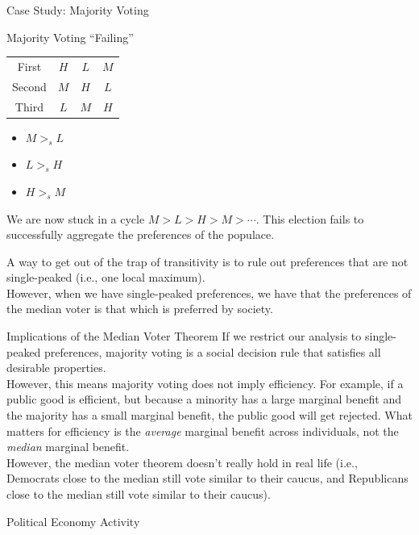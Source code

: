 \documentclass[10pt]{extarticle}
\begin{document}
\begin{problem}{Case Study: Majority Voting}
\begin{problem}{Majority Voting ``Failing''}
\begin{center}
\begin{tabular}{c|c|c|c|}
          \cline{2-4}
          First & $H$ & $L$ & $M$\\
          \cline{2-4}
          Second & $M$ & $H$ & $L$\\
          \cline{2-4}
          Third & $L$ & $M$ & $H$\\
          \cline{2-4}
        \end{tabular}
      \end{center}
      \begin{itemize}
        \item $M >_s L$
        \item $L >_s H$
        \item $H >_s M$
      \end{itemize}
      We are now stuck in a cycle $M>L>H>M>\cdots$. This election fails to successfully aggregate the preferences of the populace.
    \end{problem}
    A way to get out of the trap of transitivity is to rule out preferences that are not single-peaked (i.e., one local maximum).\\

    However, when we have single-peaked preferences, we have that the preferences of the median voter is that which is preferred by society.
  \end{problem}
  \begin{problem}{Implications of the Median Voter Theorem}
    If we restrict our analysis to single-peaked preferences, majority voting is a social decision rule that satisfies all desirable properties.\\

    However, this means majority voting does not imply efficiency. For example, if a public good is efficient, but because a minority has a large marginal benefit and the majority has a small marginal benefit, the public good will get rejected. What matters for efficiency is the \textit{average} marginal benefit across individuals, not the \textit{median} marginal benefit.\\

    However, the median voter theorem doesn't really hold in real life (i.e., Democrats close to the median still vote similar to their caucus, and Republicans close to the median still vote similar to their caucus).
  \end{problem}
  \begin{problem}{Political Economy Activity}
    \begin{tcbraster}[raster columns = 1,colframe = black!75!white,colback=white]
    \end{tcbraster}
  \end{problem}
\end{document}
